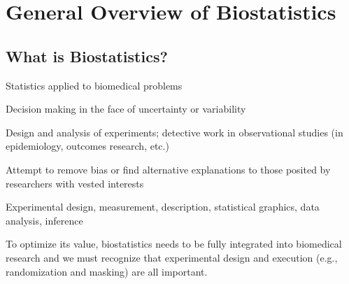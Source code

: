 \chapter{General Overview of Biostatistics}    



\section{What is Biostatistics?}
\bi
\item Statistics applied to biomedical problems
\item Decision making in the face of uncertainty or variability
\item Design and analysis of experiments; detective work in
  observational studies (in epidemiology, outcomes research, etc.)
\item Attempt to remove bias or find alternative explanations to those
  posited by researchers with vested interests
\item Experimental design, measurement, description, statistical graphics,
  data analysis, inference
\ei

To optimize its value, biostatistics needs to be fully integrated into
biomedical research and we must recognize that experimental design and
execution (e.g., randomization and masking) are all important.

